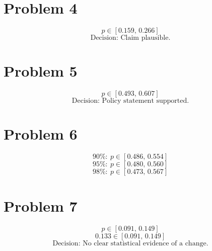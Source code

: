 \section*{Problem 4}
\[
p \in [0.159,\,0.266]
\]
\[
\text{Decision: Claim plausible.}
\]

\section*{Problem 5}
\[
p \in [0.493,\,0.607]
\]
\[
\text{Decision: Policy statement supported.}
\]

\section*{Problem 6}
\[
90\%:\ p \in [0.486,\,0.554]
\]
\[
95\%:\ p \in [0.480,\,0.560]
\]
\[
98\%:\ p \in [0.473,\,0.567]
\]

\section*{Problem 7}
\[
p \in [0.091,\,0.149]
\]
\[
0.133 \in [0.091,\,0.149]
\]
\[
\text{Decision: No clear statistical evidence of a change.}
\]


